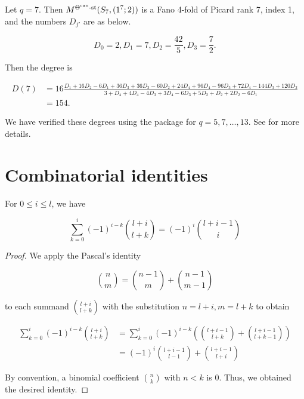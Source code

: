 \documentclass[11pt]{article}
\begin{document}
\begin{example}
    Let \(q = 7\). Then \(M^{\Theta^{\text{can}}\text{-st}}(S_7, (1^7;2))\) is a Fano 4-fold of Picard rank 7, index 1, and the numbers \(D_{j'}\) are as below. 

    \[
    D_0 = 2, D_1 = 7, D_2 = \frac{42}{5}, D_3 = \frac{7}{2}.
    \]

    Then the degree is 

    \begin{align*}
        D(7) &= 16\frac{D_1 + 16D_2 - 6D_1 + 36D_3 + 36D_3 - 60D_2 + 24D_4 + 96D_4 - 96D_3 + 72D_4 - 144D_3 + 120D_2}{3 + D_4 + 4D_4 - 4D_3 + 3D_4 - 6D_3 + 5D_2 + D_2 + 2D_2 - 6D_1}\\ 
        &= 154.
    \end{align*}
\end{example}

We have verified these degrees using the \cite{quivertools} package for \(q = 5, 7, \dots, 13\). See  for more details. 

\newpage

\appendix

\section{Combinatorial identities}\label{appendix:A}

\begin{identity}
    \label{Identity:alt-shifted-binom-sum}
    For \(0\leq i\leq l\), we have

    \[
    \sum_{k = 0}^i(-1)^{i - k}\binom{l + i}{l + k} = (-1)^i\binom{l + i - 1}{i}
    \]
\end{identity}

\begin{proof}
    We apply the Pascal's identity 

    \[
    \binom{n}{m} = \binom{n - 1}{m} + \binom{n - 1}{m - 1}
    \]

    to each summand \(\binom{l + i}{l + k}\) with the substitution \(n = l + i, m = l + k\) to obtain

    \begin{align*}
        \sum_{k = 0}^i(-1)^{i - k}\binom{l + i}{l + k} &= \sum_{k = 0}^i(-1)^{i - k}\left(\binom{l + i - 1}{l + k} + \binom{l + i - 1}{l + k - 1}\right)\\ 
        &= (-1)^i\binom{l + i - 1}{l - 1} + \binom{l + i - 1}{l + i}
    \end{align*}

    By convention, a binomial coefficient \(\binom{n}{k}\) with \(n < k\) is 0. Thus, we obtained the desired identity. 

\end{proof}
\end{document}
